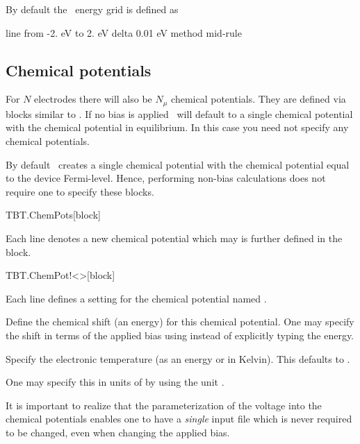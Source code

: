 By default the \tbtrans\ energy grid is defined as
\begin{fdfexample}
    line
     from -2. eV to 2. eV
      delta 0.01 eV
        method mid-rule
\end{fdfexample}


\subsection{Chemical potentials}


For $N$ electrodes there will also be $N_\mu$ chemical
potentials. They are defined via blocks similar to .
If no bias is applied \tbtrans\ will default to a single chemical
potential with the chemical potential in equilibrium. In this case you
need not specify any chemical potentials.

By default \tbtrans\ creates a single chemical potential with the
chemical potential equal to the device Fermi-level. Hence, performing
non-bias calculations does not require one to specify these blocks.

\begin{fdfentry}{TBT.ChemPots}[block]
  
  Each line denotes a new chemical potential which may is further
  defined in the  block.
  
\end{fdfentry}

\begin{fdfentry}{TBT.ChemPot!<>}[block]

  Each line defines a setting for the chemical potential named
  \fdf*{<>}.

  \begin{fdfoptions}
    

    Define the chemical shift (an energy) for this chemical
    potential. One may specify the shift in terms of the applied bias
    using  instead of explicitly typing the energy.


    Specify the electronic temperature (as an energy or in
    Kelvin). This defaults to .

    One may specify this in units of  by
    using the unit .

  \end{fdfoptions}

  It is important to realize that the parameterization of the voltage
  into the chemical potentials enables one to have a \emph{single}
  input file which is never required to be changed, even when changing
  the applied bias.

\end{fdfentry}

